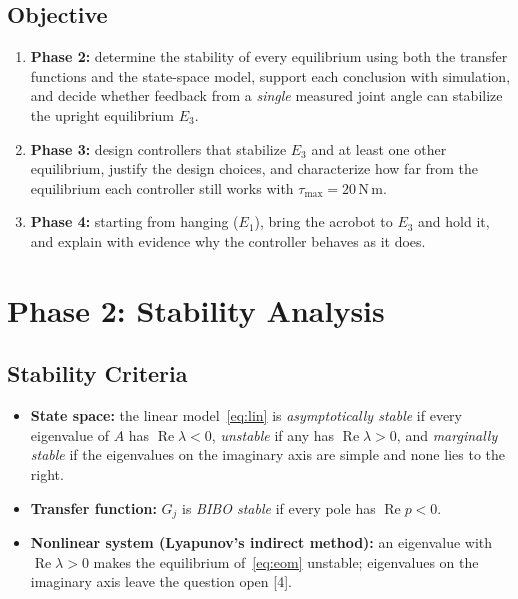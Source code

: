 \documentclass[12pt,a4paper]{article}
\newcommand{\Nm}{\,\mathrm{N\,m}}
\begin{document}
\subsection{Objective}
\begin{enumerate}
\item \textbf{Phase 2:} determine the stability of every equilibrium using both the transfer functions and the state-space model, support each conclusion with simulation, and decide whether feedback from a \emph{single} measured joint angle can stabilize the upright equilibrium $E_3$.
\item \textbf{Phase 3:} design controllers that stabilize $E_3$ and at least one other equilibrium, justify the design choices, and characterize how far from the equilibrium each controller still works with $\tau_{\max}=20\Nm$.
\item \textbf{Phase 4:} starting from hanging ($E_1$), bring the acrobot to $E_3$ and hold it, and explain with evidence why the controller behaves as it does.
\end{enumerate}

\section{Phase 2: Stability Analysis}
\subsection{Stability Criteria}
\begin{itemize}
\item \textbf{State space:} the linear model~\eqref{eq:lin} is \emph{asymptotically stable} if every eigenvalue of $A$ has $\operatorname{Re}\lambda<0$, \emph{unstable} if any has $\operatorname{Re}\lambda>0$, and \emph{marginally stable} if the eigenvalues on the imaginary axis are simple and none lies to the right.
\item \textbf{Transfer function:} $G_j$ is \emph{BIBO stable} if every pole has $\operatorname{Re}p<0$.
\item \textbf{Nonlinear system (Lyapunov's indirect method):} an eigenvalue with $\operatorname{Re}\lambda>0$ makes the equilibrium of~\eqref{eq:eom} unstable; eigenvalues on the imaginary axis leave the question open [4].
\end{itemize}
\end{document}
